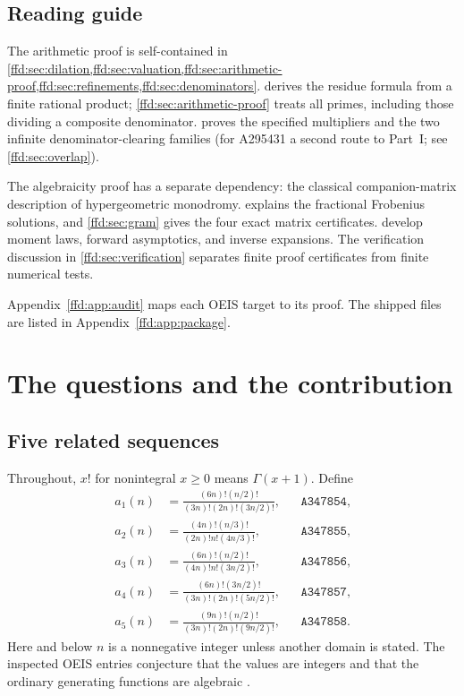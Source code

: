 \documentclass[11pt]{article}
\theoremstyle{definition}
\theoremstyle{remark}
\newcommand{\OEIS}[1]{\texttt{#1}}
\begin{document}
\subsection{Reading guide}\label{ffd:sec:reading}
The arithmetic proof is self-contained in
\cref{ffd:sec:dilation,ffd:sec:valuation,ffd:sec:arithmetic-proof,ffd:sec:refinements,ffd:sec:denominators}.
 derives the residue formula from a finite rational
product; \cref{ffd:sec:arithmetic-proof} treats all primes, including those
dividing a composite denominator.  proves the
specified multipliers and the two infinite denominator-clearing families
(for A295431 a second route to Part~I; see \cref{ffd:sec:overlap}).

The algebraicity proof has a separate dependency: the classical companion-matrix
 description of hypergeometric monodromy. 
explains the fractional Frobenius solutions, and \cref{ffd:sec:gram} gives the
four exact matrix certificates.
 develop moment laws,
forward asymptotics, and inverse expansions. The verification discussion in
\cref{ffd:sec:verification} separates finite proof certificates from finite
numerical tests.

Appendix~\ref{ffd:app:audit} maps each OEIS target to its proof. The shipped files
are listed in Appendix~\ref{ffd:app:package}.

\section{The questions and the contribution}\label{ffd:sec:questions}
\subsection{Five related sequences}
Throughout, $x!$ for nonintegral $x\ge0$ means $\Gamma(x+1)$. Define
\begin{align}
a_1(n)&=\frac{(6n)!(n/2)!}{(3n)!(2n)!(3n/2)!}, & &\OEIS{A347854},\label{ffd:eq:a1}\\
a_2(n)&=\frac{(4n)!(n/3)!}{(2n)!n!(4n/3)!}, & &\OEIS{A347855},\\
a_3(n)&=\frac{(6n)!(n/2)!}{(4n)!n!(3n/2)!}, & &\OEIS{A347856},\\
a_4(n)&=\frac{(6n)!(3n/2)!}{(3n)!(2n)!(5n/2)!}, & &\OEIS{A347857},\\
a_5(n)&=\frac{(9n)!(n/2)!}{(3n)!(2n)!(9n/2)!}, & &\OEIS{A347858}.
\end{align}
Here and below $n$ is a nonnegative integer unless another domain is stated.
The inspected OEIS entries conjecture that the values are integers and that
the ordinary generating functions are algebraic
\cite{ffd-oeis854,ffd-oeis855,ffd-oeis856,ffd-oeis857,ffd-oeis858}.
\end{document}
